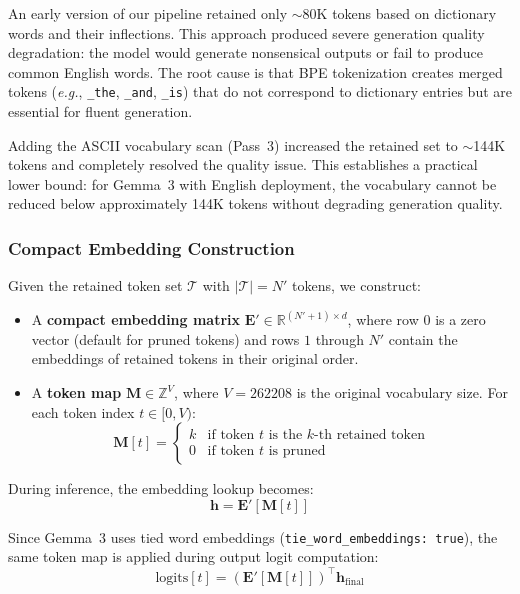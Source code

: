 \documentclass[11pt]{article}
\newcommand{\eg}{\textit{e.g.}}
\newcommand{\RR}{\mathbb{R}}
\begin{document}
An early version of our pipeline retained only $\sim$80K tokens based on dictionary words and their inflections. This approach produced severe generation quality degradation: the model would generate nonsensical outputs or fail to produce common English words. The root cause is that BPE tokenization creates merged tokens (\eg, \texttt{\_the}, \texttt{\_and}, \texttt{\_is}) that do not correspond to dictionary entries but are essential for fluent generation.

Adding the ASCII vocabulary scan (Pass~3) increased the retained set to $\sim$144K tokens and completely resolved the quality issue. This establishes a practical lower bound: for Gemma~3 with English deployment, the vocabulary cannot be reduced below approximately 144K tokens without degrading generation quality.

\subsubsection{Compact Embedding Construction}

Given the retained token set $\mathcal{T}$ with $|\mathcal{T}| = N'$ tokens, we construct:

\begin{itemize}[leftmargin=*]
    \item A \textbf{compact embedding matrix} $\mathbf{E}' \in \RR^{(N'+1) \times d}$, where row 0 is a zero vector (default for pruned tokens) and rows $1$ through $N'$ contain the embeddings of retained tokens in their original order.
    \item A \textbf{token map} $\mathbf{M} \in \mathbb{Z}^{V}$, where $V = 262208$ is the original vocabulary size. For each token index $t \in [0, V)$:
    \begin{equation}
        \mathbf{M}[t] = \begin{cases} k & \text{if token } t \text{ is the } k\text{-th retained token} \\ 0 & \text{if token } t \text{ is pruned} \end{cases}
    \end{equation}
\end{itemize}

During inference, the embedding lookup becomes:
\begin{equation}
    \mathbf{h} = \mathbf{E}'[\mathbf{M}[t]]
\end{equation}

Since Gemma~3 uses tied word embeddings (\texttt{tie\_word\_embeddings: true}), the same token map is applied during output logit computation:
\begin{equation}
    \text{logits}[t] = (\mathbf{E}'[\mathbf{M}[t]])^\top \mathbf{h}_{\text{final}}
\end{equation}
\end{document}
